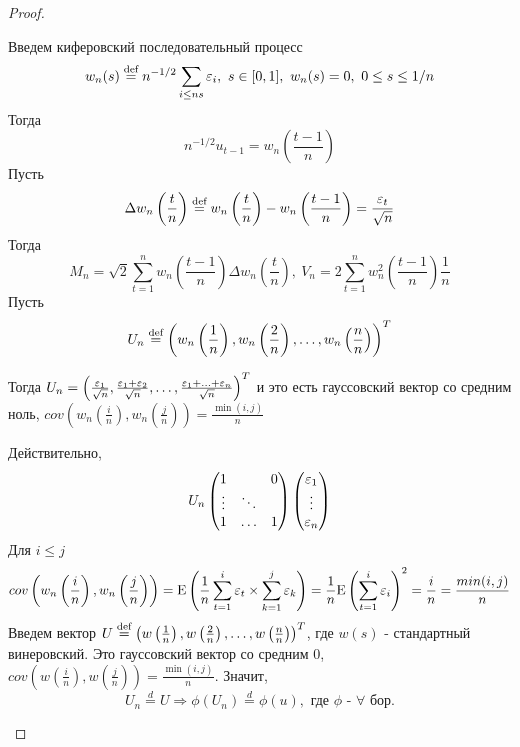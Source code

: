 \begin{proof}
\begin{enumerate}
        Введем киферовский последовательный процесс
        \[w_n(s)\defeq n^{-1/2}\sum_{i\leq ns}\eps_i,\ s\in[0,1],\ w_n(s)=0,\ 0\leq s\leq 1/n\]
        Тогда 
        \[n^{-1/2}u_{t-1}=w_n\left(\frac{t-1}{n}\right)\]
        Пусть
        \[\Delta w_n\left(\frac{t}{n}\right)\stackrel{\text{def}}{=} w_n\left(\frac{t}{n}\right)-w_n\left(\frac{t-1}{n}\right)=\frac{\varepsilon_t}{\sqrt{n}}\]
        Тогда
        \[M_n=\sqrt{2}\sum_{t=1}^nw_n\left(\frac{t-1}{n}\right)\Delta w_n\left(\frac{t}{n}\right),\ V_n=2\sum_{t=1}^nw_n^2\left(\frac{t-1}{n}\right)\frac{1}{n}\]
        Пусть
        \[U_n\stackrel{\text{def}}{=} \left(w_n\left(\frac{1}{n}\right), w_n\left(\frac{2}{n}\right),\ldots,w_n\left(\frac{n}{n}\right)\right)^T\]
        \begin{leftbar}
            Тогда $U_n=\left(\frac{\varepsilon_1}{\sqrt{n}},\frac{\varepsilon_1+\varepsilon_2}{\sqrt{n}},\ldots,\frac{\varepsilon_1+\ldots+\varepsilon_n}{\sqrt{n}}\right)^T$
            и это есть гауссовский вектор со средним ноль, $cov\left(w_n\left(\frac{i}{n}\right),w_n\left(\frac{j}{n}\right)\right)=\frac{\min(i,j)}{n}$
        \end{leftbar}
        Действительно,
        \[U_n\begin{pmatrix}
            1      &        & 0 \\
            \vdots & \ddots &    \\
            1      & \ldots &  1 \\
        \end{pmatrix}\begin{pmatrix}
            \varepsilon_1  \\ \vdots \\ \varepsilon_n
        \end{pmatrix}\]
        Для $i\leq j$
        \[cov\left(w_n\left(\frac{i}{n}\right),w_n\left(\frac{j}{n}\right)\right)=\mathrm{E}\left(\frac{1}{n}\sum_{t=1}^i\varepsilon_t\times\sum_{k=1}^j\varepsilon_k\right)=\frac{1}{n}\mathrm{E}\left(\sum_{t=1}^i\varepsilon_i\right)^2=\frac{i}{n}=\frac{min(i,j)}{n}\]
        Введем вектор $U\stackrel{\text{def}}{=}\left(w\left(\frac{1}{n}\right),w\left(\frac{2}{n}\right),\ldots,w\left(\frac{n}{n}\right)\right)^T$,
        где $w(s)$ - стандартный винеровский. Это гауссовский вектор со средним 0,
        $cov\left(w\left(\frac{i}{n}\right),w\left(\frac{j}{n}\right)\right)=\frac{\min(i,j)}{n}$.
        Значит,
        \begin{equation}\label{eq::U_almosteq}
            U_n\overset{d}{=}U \Rightarrow \phi(U_n)\overset{d}{=}\phi(u),\text{ где $\phi$ - $\forall$ бор.}
        \end{equation}
        \begin{leftbar}

\end{leftbar}
\end{enumerate}
\end{proof}
